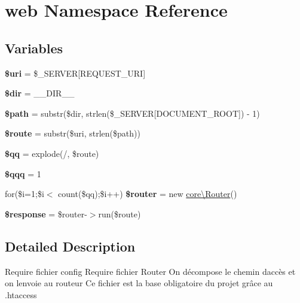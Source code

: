 \hypertarget{namespaceweb}{}\section{web Namespace Reference}
\label{namespaceweb}
\subsection*{Variables}
\begin{DoxyCompactItemize}
\item 
{\bfseries \$uri} = \$\+\_\+\+S\+E\+R\+V\+ER\mbox{[}\textquotesingle{}R\+E\+Q\+U\+E\+S\+T\+\_\+\+U\+RI\textquotesingle{}\mbox{]}\hypertarget{namespaceweb_ab9a9495546e4949e8c8b4480364fa3b1}{}\label{namespaceweb_ab9a9495546e4949e8c8b4480364fa3b1}

\item 
{\bfseries \$dir} = \+\_\+\+\_\+\+D\+I\+R\+\_\+\+\_\+\hypertarget{namespaceweb_a0262b6aa7e436b729c1778be353cab38}{}\label{namespaceweb_a0262b6aa7e436b729c1778be353cab38}

\item 
{\bfseries \$path} = substr(\$dir, strlen(\$\+\_\+\+S\+E\+R\+V\+ER\mbox{[}\textquotesingle{}D\+O\+C\+U\+M\+E\+N\+T\+\_\+\+R\+O\+OT\textquotesingle{}\mbox{]}) -\/ 1)\hypertarget{namespaceweb_acbca685a9c5888882f98458a4f4068fa}{}\label{namespaceweb_acbca685a9c5888882f98458a4f4068fa}

\item 
{\bfseries \$route} = substr(\$uri, strlen(\$path))\hypertarget{namespaceweb_ac3d799287301fc7c27b626298bef9ed4}{}\label{namespaceweb_ac3d799287301fc7c27b626298bef9ed4}

\item 
{\bfseries \$qq} = explode(\textquotesingle{}/\textquotesingle{}, \$route)\hypertarget{namespaceweb_a6bc594be47ed1b1cc304ff876bc9f1c3}{}\label{namespaceweb_a6bc594be47ed1b1cc304ff876bc9f1c3}

\item 
{\bfseries \$qqq} = 1\hypertarget{namespaceweb_a3d699ce533e850b6fb1f50c5ab1e295b}{}\label{namespaceweb_a3d699ce533e850b6fb1f50c5ab1e295b}

\item 
for(\$i=1;\$i$<$ count(\$qq);\$i++) {\bfseries \$router} = new \hyperlink{classcore_1_1Router}{core\textbackslash{}\+Router}()\hypertarget{namespaceweb_a05323e69d332f19c58ef1955fad4edbf}{}\label{namespaceweb_a05323e69d332f19c58ef1955fad4edbf}

\item 
{\bfseries \$response} = \$router-\/$>$run(\$route)\hypertarget{namespaceweb_a7cda966a03f1b96e27a86ab6bf0db607}{}\label{namespaceweb_a7cda966a03f1b96e27a86ab6bf0db607}

\end{DoxyCompactItemize}


\subsection{Detailed Description}
Require fichier config Require fichier Router On décompose le chemin d\textquotesingle{}accès et on l\textquotesingle{}envoie au routeur Ce fichier est la base obligatoire du projet grâce au .htaccess 